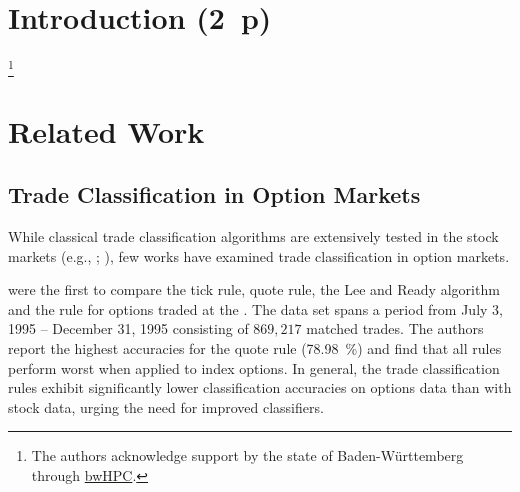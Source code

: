 
\section{Introduction (2~p)}\label{sec:introduction}

\footnote{The authors acknowledge support by the state of Baden-Württemberg through \href{https://www.bwhpc.de/}{bwHPC}.}
\newpage

\section{Related Work}\label{sec:related-work}

\subsection{Trade Classification in Option Markets}
\label{sec:trade-classification-in-option-markets}

While classical trade classification algorithms are extensively tested in the stock markets (e.g., \textcite[][3806--3821]{chakrabartyTradeClassificationAlgorithms2012}; \textcite[][259--286]{odders-whiteOccurrenceConsequencesInaccurate2000}), few works have examined trade classification in option markets.

\textcite[882--883]{savickasInferringDirectionOption2003} were the first to compare the tick rule, quote rule, the Lee and Ready algorithm and the  rule for options traded at the . The data set spans a period from July 3, 1995 -- December 31, 1995 consisting of $869{,}217$ matched trades. The authors report the highest accuracies for the quote rule (\SI{78.98}{\percent}) and find that all rules perform worst when applied to index options. In general, the trade classification rules exhibit significantly lower classification accuracies on options data than with stock data, urging the need for improved classifiers.

